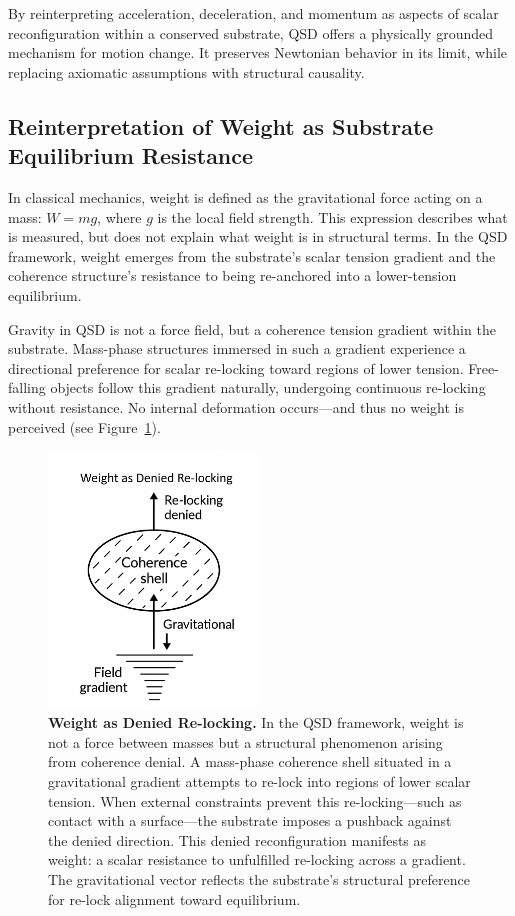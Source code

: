 \documentclass[entropy,article,submit,pdftex,moreauthors]{Definitions/mdpi}
\begin{document}
By reinterpreting acceleration, deceleration, and momentum as aspects of scalar reconfiguration within a conserved substrate, QSD offers a physically grounded mechanism for motion change. It preserves Newtonian behavior in its limit, while replacing axiomatic assumptions with structural causality.


\subsection{Reinterpretation of Weight as Substrate Equilibrium Resistance}

In classical mechanics, weight is defined as the gravitational force acting on a mass: \( W = mg \), where \( g \) is the local field strength. This expression describes what is measured, but does not explain what weight is in structural terms. In the QSD framework, weight emerges from the substrate’s scalar tension gradient and the coherence structure’s resistance to being re-anchored into a lower-tension equilibrium.

Gravity in QSD is not a force field, but a coherence tension gradient within the substrate. Mass-phase structures immersed in such a gradient experience a directional preference for scalar re-locking toward regions of lower tension. Free-falling objects follow this gradient naturally, undergoing continuous re-locking without resistance. No internal deformation occurs—and thus no weight is perceived (see Figure~\ref{fig:weight-denied-relock}).

\begin{figure}[H]
    \centering
    \includegraphics[width=0.5\textwidth]{figures/weight.png}
    \caption{
    \textbf{Weight as Denied Re-locking.}
    In the QSD framework, weight is not a force between masses but a structural phenomenon arising from coherence denial. A mass-phase coherence shell situated in a gravitational gradient attempts to re-lock into regions of lower scalar tension. When external constraints prevent this re-locking—such as contact with a surface—the substrate imposes a pushback against the denied direction. This denied reconfiguration manifests as weight: a scalar resistance to unfulfilled re-locking across a gradient. The gravitational vector reflects the substrate’s structural preference for re-lock alignment toward equilibrium.
    }
    \label{fig:weight-denied-relock}
\end{figure}
\end{document}
